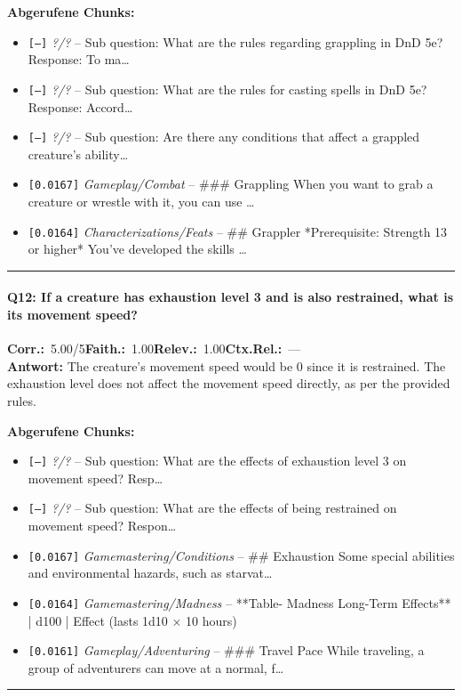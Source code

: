 \noindent\textbf{Abgerufene Chunks:}
\begin{itemize}[noitemsep, topsep=2pt]
  \item[\textbf{\#1}] \texttt{[—]} \textit{?/?} -- Sub question: What are the rules regarding grappling in DnD 5e? Response:  To ma\ldots
  \item[\textbf{\#2}] \texttt{[—]} \textit{?/?} -- Sub question: What are the rules for casting spells in DnD 5e? Response:  Accord\ldots
  \item[\textbf{\#3}] \texttt{[—]} \textit{?/?} -- Sub question: Are there any conditions that affect a grappled creature's ability\ldots
  \item[\textbf{\#4}] \texttt{[0.0167]} \textit{Gameplay/Combat} -- \#\#\# Grappling  When you want to grab a creature or wrestle with it, you can use \ldots
  \item[\textbf{\#5}] \texttt{[0.0164]} \textit{Characterizations/Feats} -- \#\# Grappler  *Prerequisite: Strength 13 or higher*  You've developed the skills \ldots
\end{itemize}
\vspace{4pt}
\hrule
\vspace{6pt}

\paragraph{Q12: If a creature has exhaustion level 3 and is also restrained, what is its movement speed?}
\noindent \textbf{Corr.:}~5.00/5\quad \textbf{Faith.:}~1.00\quad \textbf{Relev.:}~1.00\quad \textbf{Ctx.Rel.:}~—\\

\noindent\textbf{Antwort:} The creature's movement speed would be 0 since it is restrained. The exhaustion level does not affect the movement speed directly, as per the provided rules.

\noindent\textbf{Abgerufene Chunks:}
\begin{itemize}[noitemsep, topsep=2pt]
  \item[\textbf{\#1}] \texttt{[—]} \textit{?/?} -- Sub question: What are the effects of exhaustion level 3 on movement speed? Resp\ldots
  \item[\textbf{\#2}] \texttt{[—]} \textit{?/?} -- Sub question: What are the effects of being restrained on movement speed? Respon\ldots
  \item[\textbf{\#3}] \texttt{[0.0167]} \textit{Gamemastering/Conditions} -- \#\# Exhaustion  Some special abilities and environmental hazards, such as starvat\ldots
  \item[\textbf{\#4}] \texttt{[0.0164]} \textit{Gamemastering/Madness} -- **Table- Madness Long-Term Effects**  | d100   | Effect (lasts 1d10 × 10 hours)
  \item[\textbf{\#5}] \texttt{[0.0161]} \textit{Gameplay/Adventuring} -- \#\#\# Travel Pace  While traveling, a group of adventurers can move at a normal, f\ldots
\end{itemize}
\vspace{4pt}
\hrule
\vspace{6pt}

